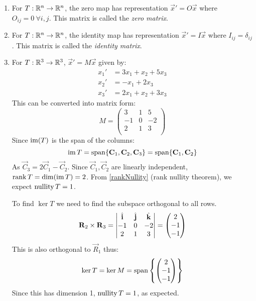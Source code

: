 \documentclass[../main.tex]{subfiles}
\begin{document}
\begin{example}
  \begin{enumerate}
    \item For $T: \mathbb{R}^{n} \to \mathbb{R}^{n}$, the zero map has representation $\vec{x}' = O\vec{x}$ where $O_{ij} = 0\ \forall i, j$.
      This matrix is called the \textit{zero matrix}.
    \item For $T: \mathbb{R}^{n} \to \mathbb{R}^{n}$, the identity map has representation $\vec{x}' = I\vec{x}$ where $I_{i j} = \delta_{i j}$.
      This matrix is called the \textit{identity matrix}.
    \item For $T: \mathbb{R}^3 \to \mathbb{R}^3$, $\vec{x}' = M \vec{x}$ given by:
      \begin{align*}
        x_1' &= 3x_1 + x_2 + 5x_3 \\
        x_2' &= -x_1 + 2x_3 \\
        x_3' &= 2x_1 + x_2 + 3x_3
      \end{align*}
      This can be converted into matrix form:
      \[
        M = \begin{pmatrix}
        3 & 1 & 5 \\
        -1 & 0 & -2 \\
        2 & 1 & 3 \\
        \end{pmatrix}
      \]
      Since $\operatorname{im}(T)$ is the span of the columns:
      \[
        \operatorname{im} T = \operatorname{span}\{\boldsymbol{\mathbf{C}}_1, \boldsymbol{\mathbf{C}}_2, \boldsymbol{\mathbf{C}}_3\} = \operatorname{span}\{\boldsymbol{\mathbf{C}}_1, \boldsymbol{\mathbf{C}}_2\}
      \]
      As $\vec{C}_3 = 2\vec{C}_1 - \vec{C}_2$.
      Since $\vec{C}_1, \vec{C}_2$ are linearly independent, $\operatorname{rank} T = \dim(\operatorname{im} T) = 2$.
      From \cref{rankNullity} (rank nullity theorem), we expect $\operatorname{nullity} T = 1$.

      To find $\ker T$ we need to find the subspace orthogonal to all rows.
      \[
        \boldsymbol{\mathbf{R}}_2 \times \boldsymbol{\mathbf{R}}_3 = \begin{vmatrix}
        \hat{\mathbf{i}} & \hat{\mathbf{j}} & \hat{\mathbf{k}} \\
        -1 & 0 & -2 \\
        2 & 1 & 3 \\
        \end{vmatrix} =
        \begin{pmatrix}
        2 \\
        -1 \\
        -1 \\
        \end{pmatrix}
      \]
      This is also orthogonal to $\vec{R}_1$ thus:
      \[
        \ker T = \ker M = \operatorname{span}\left\{
        \begin{pmatrix}
        2 \\
        -1 \\
        -1 \\
        \end{pmatrix}\right\}
      \]
      Since this has dimension 1, $\operatorname{nullity} T = 1$, as expected.
  \end{enumerate}
\end{example}
\end{document}

